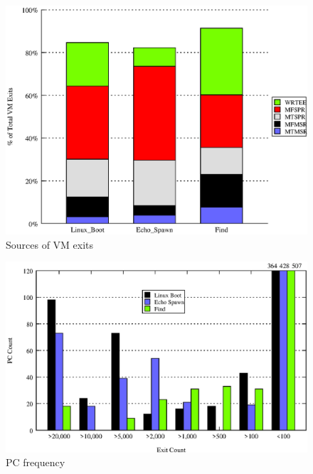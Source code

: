 \documentclass[10pt,twocolumn]{article}
\begin{document}
\begin{figure}[!htb]
\centering

\includegraphics[scale=0.5]{exit_count.eps}
\caption{Sources of VM exits}
\label{fig:opcode_time_fraction}
\end{figure}

\begin{figure}[!htb]
\centering

\includegraphics[scale=0.5]{pc_count.eps}
\caption{PC frequency}
\label{fig:pc_profile}
\end{figure}
\end{document}

